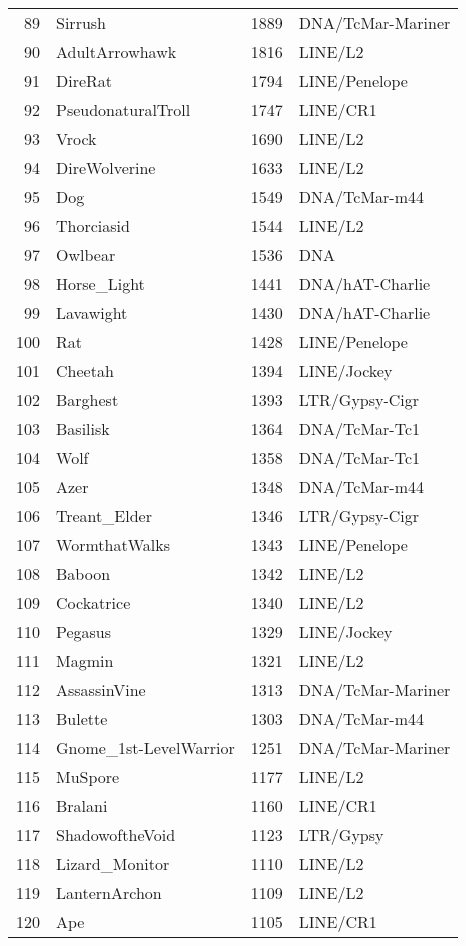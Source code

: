 \begin{table}[ht]
\begin{tabular}{rlrl}
  89 & Sirrush & 1889 & DNA/TcMar-Mariner  \\ 
  90 & AdultArrowhawk & 1816 & LINE/L2  \\ 
  91 & DireRat & 1794 & LINE/Penelope  \\ 
  92 & PseudonaturalTroll & 1747 & LINE/CR1  \\ 
  93 & Vrock & 1690 & LINE/L2  \\ 
  94 & DireWolverine & 1633 & LINE/L2  \\ 
  95 & Dog & 1549 & DNA/TcMar-m44  \\ 
  96 & Thorciasid & 1544 & LINE/L2  \\ 
  97 & Owlbear & 1536 & DNA  \\ 
  98 & Horse\_Light & 1441 & DNA/hAT-Charlie  \\ 
  99 & Lavawight & 1430 & DNA/hAT-Charlie  \\ 
  100 & Rat & 1428 & LINE/Penelope  \\ 
  101 & Cheetah & 1394 & LINE/Jockey  \\ 
  102 & Barghest & 1393 & LTR/Gypsy-Cigr  \\ 
  103 & Basilisk & 1364 & DNA/TcMar-Tc1  \\ 
  104 & Wolf & 1358 & DNA/TcMar-Tc1  \\ 
  105 & Azer & 1348 & DNA/TcMar-m44  \\ 
  106 & Treant\_Elder & 1346 & LTR/Gypsy-Cigr  \\ 
  107 & WormthatWalks & 1343 & LINE/Penelope  \\ 
  108 & Baboon & 1342 & LINE/L2  \\ 
  109 & Cockatrice & 1340 & LINE/L2  \\ 
  110 & Pegasus & 1329 & LINE/Jockey  \\ 
  111 & Magmin & 1321 & LINE/L2  \\ 
  112 & AssassinVine & 1313 & DNA/TcMar-Mariner  \\ 
  113 & Bulette & 1303 & DNA/TcMar-m44  \\ 
  114 & Gnome\_1st-LevelWarrior & 1251 & DNA/TcMar-Mariner  \\ 
  115 & MuSpore & 1177 & LINE/L2  \\ 
  116 & Bralani & 1160 & LINE/CR1  \\ 
  117 & ShadowoftheVoid & 1123 & LTR/Gypsy  \\ 
  118 & Lizard\_Monitor & 1110 & LINE/L2  \\ 
  119 & LanternArchon & 1109 & LINE/L2  \\ 
  120 & Ape & 1105 & LINE/CR1  \\ 

\end{tabular}
\end{table}
